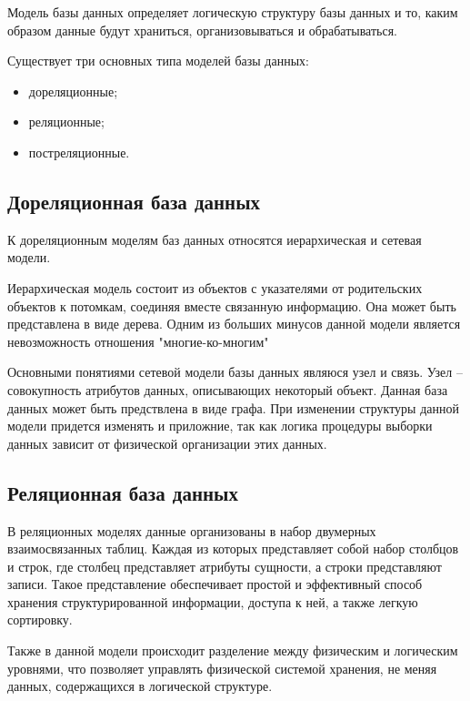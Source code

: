 
Модель базы данных определяет логическую структуру базы данных и то, каким образом данные будут храниться, организовываться
и обрабатываться.

Существует три основных типа моделей базы данных:
\begin{itemize}
    \item дореляционные;
    \item реляционные;
    \item постреляционные.
\end{itemize}

\subsection{Дореляционная база данных}

К дореляционным моделям баз данных относятся иерархическая и сетевая модели.

Иерархическая модель состоит из объектов с указателями от родительских объектов к потомкам, 
соединяя вместе связанную информацию. Она может быть представлена в виде дерева. Одним из больших минусов данной
модели является невозможность отношения "многие-ко-многим"

Основными понятиями сетевой модели базы данных являюся узел и связь. Узел -- совокупность атрибутов данных, описывающих
некоторый объект. Данная база данных может быть предствлена в виде графа. При изменении структуры данной модели придется 
изменять и приложние, так как логика процедуры выборки данных зависит от физической организации этих данных.

\subsection{Реляционная база данных}
В реляционных моделях данные организованы в набор двумерных взаимосвязанных таблиц. 
Каждая из которых представляет собой набор столбцов и строк, где столбец представляет атрибуты сущности, 
а строки представляют записи. Такое представление обеспечивает простой и эффективный способ хранения структурированной информации, 
доступа к ней, а также легкую сортировку.

Также в данной модели происходит разделение между физическим и логическим уровнями, что 
позволяет управлять физической системой хранения, не меняя данных, содержащихся в логической структуре.


